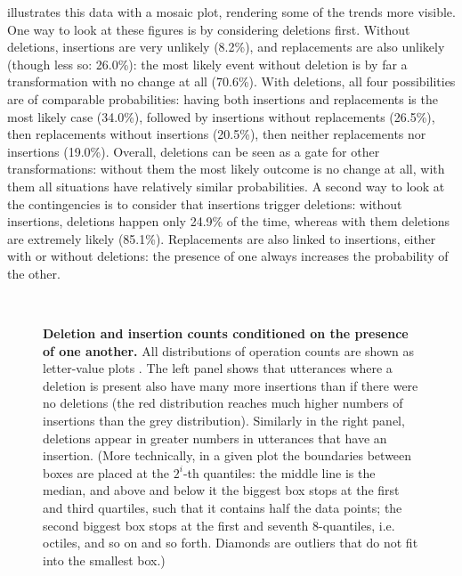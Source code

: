  illustrates this data with a mosaic plot,
rendering some of the trends more visible. One way to look at these
figures is by considering deletions first. Without deletions, insertions
are very unlikely (8.2\%), and replacements are also unlikely (though
less so: 26.0\%): the most likely event without deletion is by far a
transformation with no change at all (70.6\%). With deletions, all four
possibilities are of comparable probabilities: having both insertions
and replacements is the most likely case (34.0\%), followed by
insertions without replacements (26.5\%), then replacements without
insertions (20.5\%), then neither replacements nor insertions (19.0\%).
Overall, deletions can be seen as a gate for other transformations:
without them the most likely outcome is no change at all, with them all
situations have relatively similar probabilities. A second way to look
at the contingencies is to consider that insertions trigger deletions:
without insertions, deletions happen only 24.9\% of the time, whereas
with them deletions are extremely likely (85.1\%). Replacements are also
linked to insertions, either with or without deletions: the presence of
one always increases the probability of the other.

\begin{figure}[!ht]
  \centering
  ~
  \caption[Deletion and insertion counts conditioned on the presence of one another]{
  \textbf{Deletion and insertion counts conditioned on the presence of one another.}
  All distributions of operation counts are shown as letter-value plots \autocite{hofmann_letter-value_2011}.
  The left panel shows that utterances where a deletion is present also have many more insertions than if there were no deletions (the red distribution reaches much higher numbers of insertions than the grey distribution).
  Similarly in the right panel, deletions appear in greater numbers in utterances that have an insertion.
  (More technically, in a given plot the boundaries between boxes are placed at the $2^i$-th quantiles:
  the middle line is the median, and above and below it the biggest box stops at the first and third quartiles, such that it contains half the data points;
  the second biggest box stops at the first and seventh 8-quantiles, i.e. octiles, and so on and so forth.
  Diamonds are outliers that do not fit into the smallest box.)
  }
  \label{fig:gistr-insdel-lv}
\end{figure}

